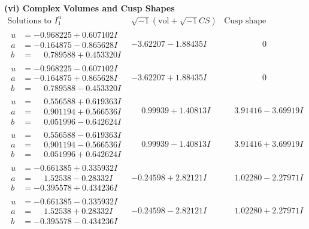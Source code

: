 \documentclass[1p]{elsarticle_modified}
\theoremstyle{definition}
\newcommand{\I}{\sqrt{-1}}
\begin{document}
\newpage\flushleft \textbf{(vi) Complex Volumes and Cusp Shapes}
$$\begin{array}{c|c|c}  
\text{Solutions to }I^u_{1}& \I (\text{vol} + \sqrt{-1}CS) & \text{Cusp shape}\\
 \hline 
\begin{aligned}
u &= -0.968225 + 0.607102 I \\
a &= -0.164875 - 0.865628 I \\
b &= \phantom{-}0.789588 + 0.453320 I\end{aligned}
 & -3.62207 - 1.88435 I & \phantom{-0.000000 } 0 \\ \hline\begin{aligned}
u &= -0.968225 - 0.607102 I \\
a &= -0.164875 + 0.865628 I \\
b &= \phantom{-}0.789588 - 0.453320 I\end{aligned}
 & -3.62207 + 1.88435 I & \phantom{-0.000000 } 0 \\ \hline\begin{aligned}
u &= \phantom{-}0.556588 + 0.619363 I \\
a &= \phantom{-}0.901194 + 0.566536 I \\
b &= \phantom{-}0.051996 - 0.642624 I\end{aligned}
 & \phantom{-}0.99939 + 1.40813 I & \phantom{-}3.91416 - 3.69919 I \\ \hline\begin{aligned}
u &= \phantom{-}0.556588 - 0.619363 I \\
a &= \phantom{-}0.901194 - 0.566536 I \\
b &= \phantom{-}0.051996 + 0.642624 I\end{aligned}
 & \phantom{-}0.99939 - 1.40813 I & \phantom{-}3.91416 + 3.69919 I \\ \hline\begin{aligned}
u &= -0.661385 + 0.335932 I \\
a &= \phantom{-}1.52538 - 0.28332 I \\
b &= -0.395578 + 0.434236 I\end{aligned}
 & -0.24598 + 2.82121 I & \phantom{-}1.02280 - 2.27971 I \\ \hline\begin{aligned}
u &= -0.661385 - 0.335932 I \\
a &= \phantom{-}1.52538 + 0.28332 I \\
b &= -0.395578 - 0.434236 I\end{aligned}
 & -0.24598 - 2.82121 I & \phantom{-}1.02280 + 2.27971 I \\ \hline\begin{aligned}

\end{aligned}
\end{array}$$
\end{document}
